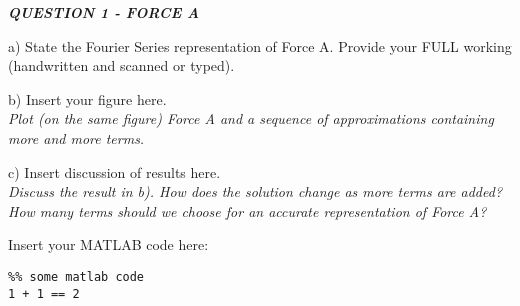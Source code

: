 \begin{tcolorbox}[colback=gray!50,enhanced,sharp corners,frame hidden,halign=left]
    \textbf{\textit{QUESTION 1 - FORCE A}}
\end{tcolorbox}

a) State the Fourier Series representation of Force A. Provide your FULL working (handwritten and scanned or typed).
\begin{flushright}
    [10 Marks*]
\end{flushright}







\noindent\makebox[\linewidth]{\rule{\linewidth}{0.4pt}}
b) Insert your figure here. \\
\textit{Plot (on the same figure) Force A and a sequence of approximations containing more and more terms.}
\begin{flushright}
\end{flushright}









\noindent\makebox[\linewidth]{\rule{\linewidth}{0.4pt}}
c) Insert discussion of results here. \\
\textit{Discuss the result in b). How does the solution change as more terms are added? How many terms should we choose for an accurate representation of Force A?}
\begin{flushright}
\end{flushright}





\noindent\makebox[\linewidth]{\rule{\linewidth}{0.4pt}}
Insert your MATLAB code here:

\begin{lstlisting}
%% some matlab code
1 + 1 == 2
\end{lstlisting}


\clearpage